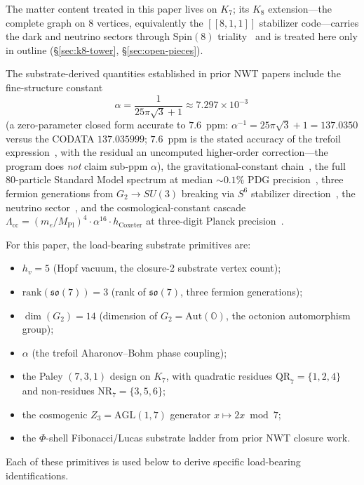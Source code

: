 \documentclass[11pt]{article}
\newcommand{\so}{\mathfrak{so}}
\newcommand{\ranksoseven}{\mathrm{rank}(\so(7))}
\newcommand{\dimGtwo}{\dim(G_2)}
\newcommand{\Aut}{\mathrm{Aut}}
\newcommand{\HV}{h_v}
\newcommand{\QR}{\mathrm{QR}}
\newcommand{\NR}{\mathrm{NR}}
\begin{document}
The matter content treated in this paper lives on $K_7$; its $K_8$ extension---the complete graph on $8$ vertices, equivalently the $[[8, 1, 1]]$ stabilizer code---carries the dark and neutrino sectors through $\mathrm{Spin}(8)$ triality~\cite{Paper20} and is treated here only in outline (\S\ref{sec:k8-tower}, \S\ref{sec:open-pieces}).

The substrate-derived quantities established in prior NWT papers include the fine-structure constant~\cite{Paper8a}
\begin{equation}
  \alpha = \frac{1}{25\pi\sqrt 3 + 1} \approx 7.297\times 10^{-3} \,
\end{equation}
(a zero-parameter closed form accurate to $7.6$~ppm: $\alpha^{-1} = 25\pi\sqrt 3 + 1 = 137.0350$ versus the CODATA $137.035999$; $7.6$~ppm is the stated accuracy of the trefoil expression~\cite{Paper8a}, with the residual an uncomputed higher-order correction---the program does \emph{not} claim sub-ppm $\alpha$), the gravitational-constant chain~\cite{Paper17}, the full 80-particle Standard Model spectrum at median $\sim 0.1\%$ PDG precision~\cite{Paper13}, three fermion generations from $G_2 \to SU(3)$ breaking via $S^6$ stabilizer direction~\cite{Paper20}, the neutrino sector~\cite{Paper20}, and the cosmological-constant cascade $\Lambda_\text{cc} = (m_e / M_\text{Pl})^4 \cdot \alpha^{16} \cdot h_\text{Coxeter}$ at three-digit Planck precision~\cite{Paper25Memo}.

For this paper, the load-bearing substrate primitives are:
\begin{itemize}
\item $\HV = 5$ (Hopf vacuum, the closure-2 substrate vertex count);
\item $\ranksoseven = 3$ (rank of $\so(7)$, three fermion generations);
\item $\dimGtwo = 14$ (dimension of $G_2 = \Aut(\mathbb{O})$, the octonion automorphism group);
\item $\alpha$ (the trefoil Aharonov--Bohm phase coupling);
\item the Paley $(7, 3, 1)$ design on $K_7$, with quadratic residues $\QR_7 = \{1, 2, 4\}$ and non-residues $\NR_7 = \{3, 5, 6\}$;
\item the cosmogenic $Z_3 = \mathrm{AGL}(1, 7)$ generator $x \mapsto 2x \bmod 7$;
\item the $\Phi$-shell Fibonacci/Lucas substrate ladder from prior NWT closure work.
\end{itemize}
Each of these primitives is used below to derive specific load-bearing identifications.
\end{document}
